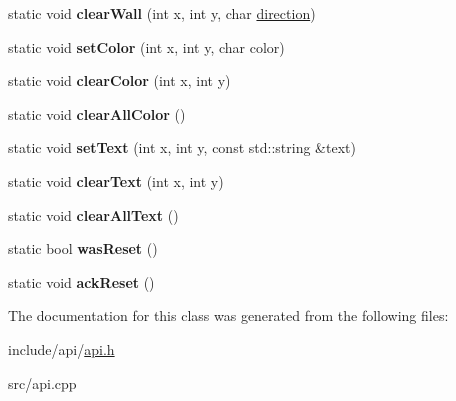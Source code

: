 \begin{DoxyCompactItemize}
static void {\bfseries clear\+Wall} (int x, int y, char \hyperlink{util_8h_a99f26e6ee9fcd62f75203b5402df8098}{direction})
\item 
\mbox{\label{class_a_p_i_aee5aaa673b406ddaab3310fcb3a51d83}} 
static void {\bfseries set\+Color} (int x, int y, char color)
\item 
\mbox{\label{class_a_p_i_ae5c04edd8e44f455ac6bf8a19c2ba282}} 
static void {\bfseries clear\+Color} (int x, int y)
\item 
\mbox{\label{class_a_p_i_a26cc8c35d6c492fc782647b7e347525e}} 
static void {\bfseries clear\+All\+Color} ()
\item 
\mbox{\label{class_a_p_i_a25a489520b0b69b7a0b1870cf350f654}} 
static void {\bfseries set\+Text} (int x, int y, const std\+::string \&text)
\item 
\mbox{\label{class_a_p_i_a0937e059fff7d9543187765500fa4968}} 
static void {\bfseries clear\+Text} (int x, int y)
\item 
\mbox{\label{class_a_p_i_a212ef41a4d954a80cd08f462fdb9f631}} 
static void {\bfseries clear\+All\+Text} ()
\item 
\mbox{\label{class_a_p_i_ab754e11300491d9efee2da2eda368d93}} 
static bool {\bfseries was\+Reset} ()
\item 
\mbox{\label{class_a_p_i_a3e6a76df2da89bd7f7fc72a96e0a9094}} 
static void {\bfseries ack\+Reset} ()
\end{DoxyCompactItemize}


The documentation for this class was generated from the following files\+:\begin{DoxyCompactItemize}
\item 
include/api/\hyperlink{api_8h}{api.\+h}\item 
src/api.\+cpp\end{DoxyCompactItemize}
